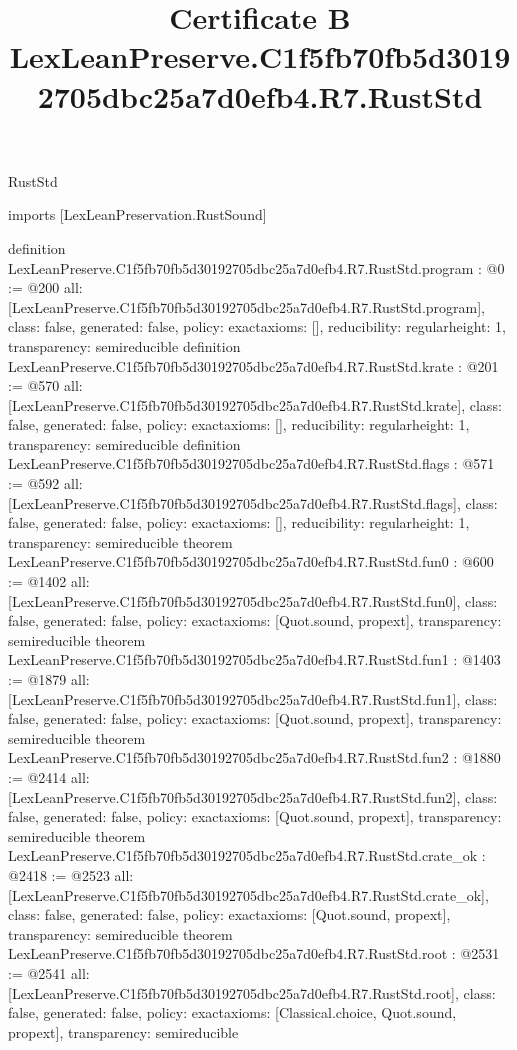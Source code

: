 \begin{lexlean}{RustStd}
\title{Certificate B LexLeanPreserve.C1f5fb70fb5d30192705dbc25a7d0efb4.R7.RustStd}
\begin{coremodule}
imports [LexLeanPreservation.RustSound]

definition LexLeanPreserve.C1f5fb70fb5d30192705dbc25a7d0efb4.R7.RustStd.program : @0 := @200 {
  all: [LexLeanPreserve.C1f5fb70fb5d30192705dbc25a7d0efb4.R7.RustStd.program],
  class: false,
  generated: false,
  policy: exact{axioms: []},
  reducibility: regular{height: 1},
  transparency: semireducible
}
definition LexLeanPreserve.C1f5fb70fb5d30192705dbc25a7d0efb4.R7.RustStd.krate : @201 := @570 {
  all: [LexLeanPreserve.C1f5fb70fb5d30192705dbc25a7d0efb4.R7.RustStd.krate],
  class: false,
  generated: false,
  policy: exact{axioms: []},
  reducibility: regular{height: 1},
  transparency: semireducible
}
definition LexLeanPreserve.C1f5fb70fb5d30192705dbc25a7d0efb4.R7.RustStd.flags : @571 := @592 {
  all: [LexLeanPreserve.C1f5fb70fb5d30192705dbc25a7d0efb4.R7.RustStd.flags],
  class: false,
  generated: false,
  policy: exact{axioms: []},
  reducibility: regular{height: 1},
  transparency: semireducible
}
theorem LexLeanPreserve.C1f5fb70fb5d30192705dbc25a7d0efb4.R7.RustStd.fun0 : @600 := @1402 {
  all: [LexLeanPreserve.C1f5fb70fb5d30192705dbc25a7d0efb4.R7.RustStd.fun0],
  class: false,
  generated: false,
  policy: exact{axioms: [Quot.sound, propext]},
  transparency: semireducible
}
theorem LexLeanPreserve.C1f5fb70fb5d30192705dbc25a7d0efb4.R7.RustStd.fun1 : @1403 := @1879 {
  all: [LexLeanPreserve.C1f5fb70fb5d30192705dbc25a7d0efb4.R7.RustStd.fun1],
  class: false,
  generated: false,
  policy: exact{axioms: [Quot.sound, propext]},
  transparency: semireducible
}
theorem LexLeanPreserve.C1f5fb70fb5d30192705dbc25a7d0efb4.R7.RustStd.fun2 : @1880 := @2414 {
  all: [LexLeanPreserve.C1f5fb70fb5d30192705dbc25a7d0efb4.R7.RustStd.fun2],
  class: false,
  generated: false,
  policy: exact{axioms: [Quot.sound, propext]},
  transparency: semireducible
}
theorem LexLeanPreserve.C1f5fb70fb5d30192705dbc25a7d0efb4.R7.RustStd.crate_ok : @2418 := @2523 {
  all: [LexLeanPreserve.C1f5fb70fb5d30192705dbc25a7d0efb4.R7.RustStd.crate_ok],
  class: false,
  generated: false,
  policy: exact{axioms: [Quot.sound, propext]},
  transparency: semireducible
}
theorem LexLeanPreserve.C1f5fb70fb5d30192705dbc25a7d0efb4.R7.RustStd.root : @2531 := @2541 {
  all: [LexLeanPreserve.C1f5fb70fb5d30192705dbc25a7d0efb4.R7.RustStd.root],
  class: false,
  generated: false,
  policy: exact{axioms: [Classical.choice, Quot.sound, propext]},
  transparency: semireducible
}


\end{coremodule}
\end{lexlean}
